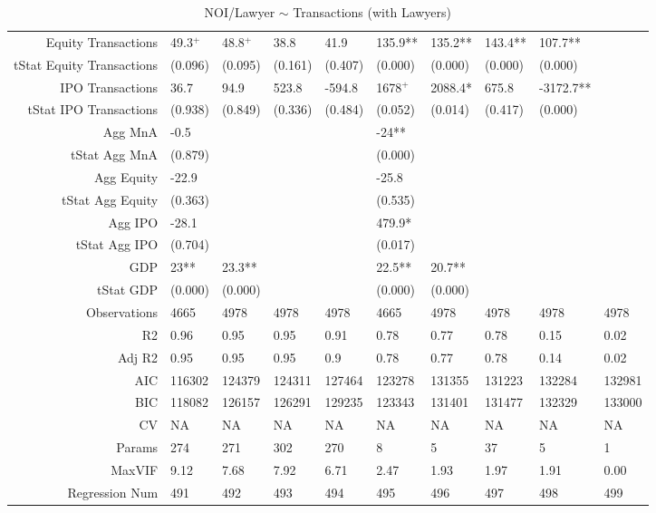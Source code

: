 \begin{table}[ht]
\begin{tabular}{rlllllllll}
  Equity Transactions & 49.3$^{+}$ & 48.8$^{+}$ & 38.8 & 41.9 & 135.9** & 135.2** & 143.4** & 107.7** &  \\ 
  tStat Equity Transactions & (0.096) & (0.095) & (0.161) & (0.407) & (0.000) & (0.000) & (0.000) & (0.000) &  \\ 
  IPO Transactions & 36.7 & 94.9 & 523.8 & -594.8 & 1678$^{+}$ & 2088.4* & 675.8 & -3172.7** &  \\ 
  tStat IPO Transactions & (0.938) & (0.849) & (0.336) & (0.484) & (0.052) & (0.014) & (0.417) & (0.000) &  \\ 
  Agg MnA & -0.5 &  &  &  & -24** &  &  &  &  \\ 
  tStat Agg MnA & (0.879) &  &  &  & (0.000) &  &  &  &  \\ 
  Agg Equity & -22.9 &  &  &  & -25.8 &  &  &  &  \\ 
  tStat Agg Equity & (0.363) &  &  &  & (0.535) &  &  &  &  \\ 
  Agg IPO & -28.1 &  &  &  & 479.9* &  &  &  &  \\ 
  tStat Agg IPO & (0.704) &  &  &  & (0.017) &  &  &  &  \\ 
  GDP & 23** & 23.3** &  &  & 22.5** & 20.7** &  &  &  \\ 
  tStat GDP & (0.000) & (0.000) &  &  & (0.000) & (0.000) &  &  &  \\ 
  Observations & 4665 & 4978 & 4978 & 4978 & 4665 & 4978 & 4978 & 4978 & 4978 \\ 
  R2 & 0.96 & 0.95 & 0.95 & 0.91 & 0.78 & 0.77 & 0.78 & 0.15 & 0.02 \\ 
  Adj R2 & 0.95 & 0.95 & 0.95 & 0.9 & 0.78 & 0.77 & 0.78 & 0.14 & 0.02 \\ 
  AIC & 116302 & 124379 & 124311 & 127464 & 123278 & 131355 & 131223 & 132284 & 132981 \\ 
  BIC & 118082 & 126157 & 126291 & 129235 & 123343 & 131401 & 131477 & 132329 & 133000 \\ 
  CV & NA & NA & NA & NA & NA & NA & NA & NA & NA \\ 
  Params & 274 & 271 & 302 & 270 & 8 & 5 & 37 & 5 & 1 \\ 
  MaxVIF & 9.12 & 7.68 & 7.92 & 6.71 & 2.47 & 1.93 & 1.97 & 1.91 & 0.00 \\ 
  Regression Num & 491 & 492 & 493 & 494 & 495 & 496 & 497 & 498 & 499 \\ 
   \hline
\end{tabular}
\caption{NOI/Lawyer $\sim$ Transactions (with Lawyers)} 
\end{table}

